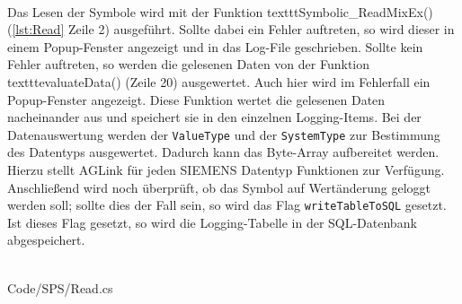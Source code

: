 \ \\
Das Lesen der Symbole wird mit der Funktion texttt{Symbolic\_{}ReadMixEx()} (\autoref{lst:Read} Zeile 2) ausgeführt. Sollte dabei ein Fehler auftreten, so wird dieser in einem Popup-Fenster angezeigt und in das Log-File geschrieben. Sollte kein Fehler auftreten, so werden die gelesenen Daten von der Funktion texttt{evaluateData()} (Zeile 20) ausgewertet. Auch hier wird im Fehlerfall ein Popup-Fenster angezeigt. Diese Funktion wertet die gelesenen Daten nacheinander aus und speichert sie in den einzelnen Logging-Items. Bei der Datenauswertung werden der \texttt{ValueType} und der \texttt{SystemType} zur Bestimmung des Datentyps ausgewertet. Dadurch kann das Byte-Array aufbereitet werden. Hierzu stellt AGLink für jeden SIEMENS Datentyp Funktionen zur Verfügung. Anschließend wird noch überprüft, ob das Symbol auf Wertänderung geloggt werden soll; sollte dies der Fall sein, so wird das Flag \texttt{writeTableToSQL} gesetzt. Ist dieses Flag gesetzt, so wird die Logging-Tabelle in der SQL-Datenbank abgespeichert.
\ \\
\begin{minipage}{\textwidth}
\ \\
 {Code/SPS/Read.cs}
\ \\
\end{minipage}

